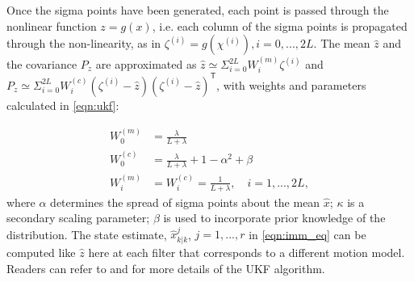 \documentclass[journal]{IEEEtran}
\DeclareRobustCommand{\clnote}[1]{\ifthenelse{\boolean{include-notes}}%
{\textcolor{orange}{\textbf{CL: #1}}}{}}
\begin{document}
	Once the sigma points have been generated, each point is passed through the nonlinear function $z=g(x)$, i.e. each column of the sigma points is propagated through the non-linearity, as in $\zeta^{(i)}=g(\chi^{(i)}), i=0,...,2L$. 
    The mean $\hat{z}$ and the covariance $P_z$ are approximated as $\hat{z}\simeq \Sigma_{i=0}^{2L}W_i^{(m)} \zeta^{(i)}$ and $P_z \simeq  \Sigma_{i=0}^{2L}W_i^{(c)}(\zeta^{(i)}-\hat{z})(\zeta^{(i)}-\hat{z})^\mathsf{T}$, with weights and parameters calculated in \cref{eqn:ukf}:
    
    \begin{subequations}\label{eqn:ukf}
		\begin{align}
			W_0^{(m)}&=\frac{\lambda}{L+\lambda}\\
			W_0^{(c)}&=\frac{\lambda}{L+\lambda}+1-\alpha^2+\beta\\
			W_i^{(m)}&=W_i^{(c)}=\frac{1}{L+\lambda},\quad i=1,...,2L,
		\end{align}
	\end{subequations}\normalsize
	where $\alpha$ determines the spread of sigma points about the mean $\hat{x}$; $\kappa$ is a secondary scaling parameter; $\beta$ is used to incorporate prior knowledge of the distribution.	
    The state estimate, $\hat{x}^j_{k|k}$, $j=1,...,r$ in \cref{eqn:imm_eq} can be computed like $\hat{z}$ here at each filter that corresponds to a different motion model. 
	Readers can refer to \cite {haykin2004kalman} and \cite {julier2004unscented} for more details of the UKF algorithm.
    
\end{document}
